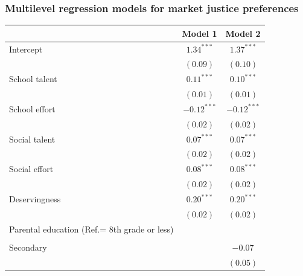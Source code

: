 \documentclass[
  letterpaper,
  DIV=11,
  numbers=noendperiod]{scrartcl}
\begin{document}
\hypertarget{multilevel-regression-models-for-market-justice-preferences}{%
\subsubsection{Multilevel regression models for market justice
preferences}\label{multilevel-regression-models-for-market-justice-preferences}}

\hypertarget{tbl-individual-reg}{}
\begin{table}
\begin{center}
\begin{tabular}{l c c}
\hline
 & Model 1 & Model 2 \\
\hline
Intercept                                    & $1.34^{***}$  & $1.37^{***}$  \\
                                             & $(0.09)$      & $(0.10)$      \\
School talent                                & $0.11^{***}$  & $0.10^{***}$  \\
                                             & $(0.01)$      & $(0.01)$      \\
School effort                                & $-0.12^{***}$ & $-0.12^{***}$ \\
                                             & $(0.02)$      & $(0.02)$      \\
Social talent                                & $0.07^{***}$  & $0.07^{***}$  \\
                                             & $(0.02)$      & $(0.02)$      \\
Social effort                                & $0.08^{***}$  & $0.08^{***}$  \\
                                             & $(0.02)$      & $(0.02)$      \\
Deservingness                                & $0.20^{***}$  & $0.20^{***}$  \\
                                             & $(0.02)$      & $(0.02)$      \\
Parental education (Ref.= 8th grade or less) &               &               \\
                                             &               &               \\
\quad Secondary                              &               & $-0.07$       \\
                                             &               & $(0.05)$      \\

\end{tabular}
\end{center}
\end{table}
\end{document}
